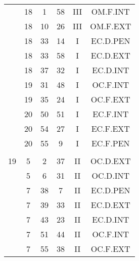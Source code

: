 \documentclass[12pt, a4paper]{article}
\begin{document}
\begin{multicols}{3}
{\begin{tabular}{c c c c c c}
	 	 	 	 & 18 & 1 & 58 & III & OM.F.INT\\%
	 	 	 	 & 18 & 10 & 26 & III & OM.F.EXT\\%
	 	 	 	 & 18 & 33 & 14 & I & EC.D.PEN\\%
	 	 	 	 & 18 & 33 & 58 & I & EC.D.EXT\\%
	 	 	 	 & 18 & 37 & 32 & I & EC.D.INT\\%
	 	 	 	 & 19 & 31 & 48 & I & OC.F.INT\\%
	 	 	 	 & 19 & 35 & 24 & I & OC.F.EXT\\%
	 	 	 	 & 20 & 50 & 51 & I & EC.F.INT\\%
	 	 	 	 & 20 & 54 & 27 & I & EC.F.EXT\\%
	 	 	 	 & 20 & 55 & 9 & I & EC.F.PEN\\%
	 	 	 	 & & & & & \\%
	 	 	 	19 & 5 & 2 & 37 & II & OC.D.EXT\\%
	 	 	 	 & 5 & 6 & 31 & II & OC.D.INT\\%
	 	 	 	 & 7 & 38 & 7 & II & EC.D.PEN\\%
	 	 	 	 & 7 & 39 & 33 & II & EC.D.EXT\\%
	 	 	 	 & 7 & 43 & 23 & II & EC.D.INT\\%
	 	 	 	 & 7 & 51 & 44 & II & OC.F.INT\\%
	 	 	 	 & 7 & 55 & 38 & II & OC.F.EXT\\%
	 	 \end{tabular}
 	}
\end{multicols}
\end{document}

